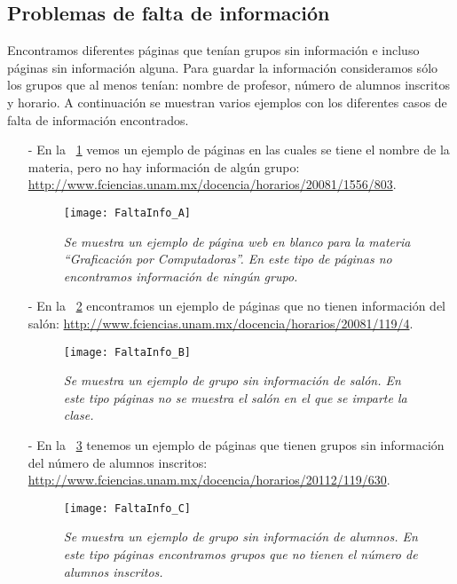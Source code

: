 \subsection{Problemas de falta de información}

Encontramos diferentes páginas que tenían grupos sin información e incluso páginas sin información alguna. Para guardar la información consideramos sólo los grupos que al menos tenían: nombre de profesor, número de alumnos inscritos y horario. A continuación se muestran varios ejemplos con los diferentes casos de falta de información encontrados.


\begin{itemize}
\item[-] En la \figurename{~\ref{pagEnBlanco}} vemos un ejemplo de páginas en las cuales se tiene el nombre de la materia, pero no hay información de algún grupo: \url{http://www.fciencias.unam.mx/docencia/horarios/20081/1556/803}.

\begin{figure}[H]
\centering
\texttt{[image: FaltaInfo\_A]} %
\caption[\textit{Página web en blanco}]{\textit{Se muestra un ejemplo de página web en blanco para la materia ``Graficación por Computadoras''. En este tipo de páginas no encontramos información de ningún grupo.}}\label{pagEnBlanco}
\end{figure}

\item[-] En la \figurename{~\ref{GpoSinInfo}} encontramos un ejemplo de páginas que no tienen información del salón: \url{http://www.fciencias.unam.mx/docencia/horarios/20081/119/4}.

\begin{figure}[H]
\centering
\texttt{[image: FaltaInfo\_B]} %
\caption[\textit{Grupo sin información de salón}]{\textit{Se muestra un ejemplo de grupo sin información de salón. En este tipo páginas no se muestra el salón en el que se imparte la clase.}}\label{GpoSinInfo}
\end{figure}

\item[-] En la \figurename{~\ref{GpoSinAlumnos}} tenemos un ejemplo de páginas que tienen grupos sin información del número de alumnos inscritos: \url{http://www.fciencias.unam.mx/docencia/horarios/20112/119/630}.

\begin{figure}[H]
\centering
\texttt{[image: FaltaInfo\_C]} %
\caption[\textit{Grupo sin información de alumnos}]{\textit{Se muestra un ejemplo de grupo sin información de alumnos. En este tipo páginas encontramos grupos que no tienen el número de alumnos inscritos.}}\label{GpoSinAlumnos}
\end{figure}


\end{itemize}
